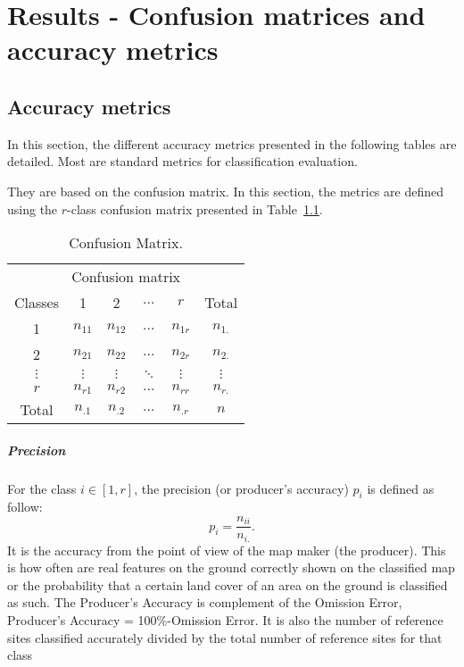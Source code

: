 
\chapter{Results - Confusion matrices and accuracy metrics} %

\label{AppendixC} %

\startcontents[chapters]
\Mprintcontents
\section{Accuracy metrics}
In this section, the different accuracy metrics presented in the following tables are detailed. Most are standard metrics for classification evaluation. 

They are based on the confusion matrix. In this section, the metrics are defined using the $r$-class confusion matrix presented in Table~\ref{table:confusion_ref}.

\begin{table}[H]
\begin{center}
\begin{tabular}{c|c c c c| c}

\multicolumn{6}{c}{Confusion matrix} \\

 Classes & 1 & 2 & $\hdots$ & $r$ & Total \\
\hline
1 & $n_{11}$ & $n_{12}$ & $\hdots$ & $n_{1r}$ & $n_{1.}$ \\
2  & $n_{21}$ & $n_{22}$ & $\hdots$ & $n_{2r}$ & $n_{2.}$ \\
$\vdots$  & $\vdots$ & $\vdots$ & $\ddots$ & $\vdots$ & $\vdots$\\
$r$ & $n_{r1}$ & $n_{r2}$ & $\hdots$ & $n_{rr}$ & $n_{r.}$\\
\hline
Total & $n_{.1}$ & $n_{.2}$ & $\hdots$ & $n_{.r}$ & $n$\\
\end{tabular}
\caption{Confusion Matrix.}
\label{table:confusion_ref}
\end{center}
\end{table}


\paragraph{Precision \\}
For the class $i \in [1,r]$, the precision (or producer's accuracy) $p_{i}$ is defined as follow:
\begin{equation}
p_{i}=\frac{n_{ii}}{n_{i.}}.
\end{equation}
It is the accuracy from the point of view of the map maker (the producer). This is how often are real features on the ground correctly shown on the classified map or the probability that a certain land cover of an area on the ground is classified as such. The Producer's Accuracy is complement of the Omission Error, Producer's Accuracy = 100\%-Omission Error. It is also the number of reference sites classified accurately divided by the total number of reference sites for that class

